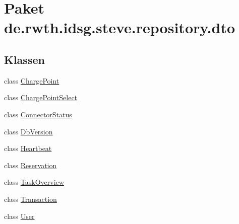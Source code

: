 \hypertarget{namespacede_1_1rwth_1_1idsg_1_1steve_1_1repository_1_1dto}{\section{Paket de.\-rwth.\-idsg.\-steve.\-repository.\-dto}
\label{namespacede_1_1rwth_1_1idsg_1_1steve_1_1repository_1_1dto}
}
\subsection*{Klassen}
\begin{DoxyCompactItemize}
\item 
class \hyperlink{classde_1_1rwth_1_1idsg_1_1steve_1_1repository_1_1dto_1_1_charge_point}{Charge\-Point}
\item 
class \hyperlink{classde_1_1rwth_1_1idsg_1_1steve_1_1repository_1_1dto_1_1_charge_point_select}{Charge\-Point\-Select}
\item 
class \hyperlink{classde_1_1rwth_1_1idsg_1_1steve_1_1repository_1_1dto_1_1_connector_status}{Connector\-Status}
\item 
class \hyperlink{classde_1_1rwth_1_1idsg_1_1steve_1_1repository_1_1dto_1_1_db_version}{Db\-Version}
\item 
class \hyperlink{classde_1_1rwth_1_1idsg_1_1steve_1_1repository_1_1dto_1_1_heartbeat}{Heartbeat}
\item 
class \hyperlink{classde_1_1rwth_1_1idsg_1_1steve_1_1repository_1_1dto_1_1_reservation}{Reservation}
\item 
class \hyperlink{classde_1_1rwth_1_1idsg_1_1steve_1_1repository_1_1dto_1_1_task_overview}{Task\-Overview}
\item 
class \hyperlink{classde_1_1rwth_1_1idsg_1_1steve_1_1repository_1_1dto_1_1_transaction}{Transaction}
\item 
class \hyperlink{classde_1_1rwth_1_1idsg_1_1steve_1_1repository_1_1dto_1_1_user}{User}
\end{DoxyCompactItemize}
